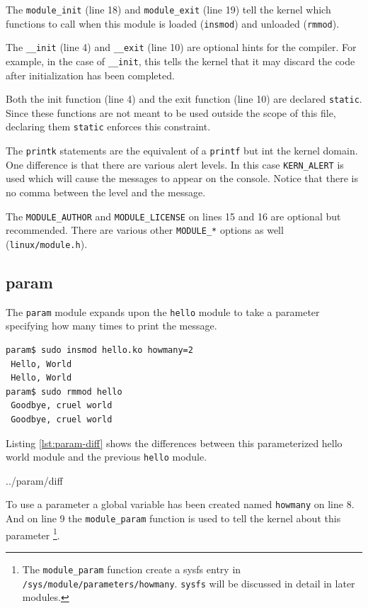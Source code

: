 \documentclass{article}
\begin{document}
The \verb+module_init+ (line 18) and \verb+module_exit+ (line 19) tell
the kernel which functions to call when this module is
loaded (\verb+insmod+) and unloaded (\verb+rmmod+).

The \verb+__init+ (line 4) and \verb+__exit+ (line 10)
are optional hints for the compiler.  For example, in the case of
\verb+__init+, this tells the kernel that it may discard the code
after initialization has been completed.

Both the init function (line 4) and the exit function (line 10)
are declared \verb+static+.
Since these functions are not meant to be used outside the scope
of this file, declaring them \verb+static+ enforces this
constraint\autocite[Pg. 52]{corbet2009linux}.

The \verb+printk+ statements are the equivalent of a \verb+printf+ but
int the kernel domain.
One difference is that there are various alert levels.
In this case \verb+KERN_ALERT+ is used which will cause the messages
to appear on the console.
Notice that there is no comma between the level and the message.

The \verb+MODULE_AUTHOR+ and \verb+MODULE_LICENSE+ on lines 15 and 16
are optional but recommended\autocite[Pg. 51]{corbet2009linux}.
There are various other \verb+MODULE_*+
options as well (\verb+linux/module.h+).

\subsection{param}

The \verb+param+ module expands upon the \verb+hello+ module to
take a parameter specifying how many times to print the message.

\begin{verbatim}
param$ sudo insmod hello.ko howmany=2
 Hello, World
 Hello, World
param$ sudo rmmod hello
 Goodbye, cruel world
 Goodbye, cruel world
\end{verbatim}

Listing \ref{lst:param-diff} shows the differences between this
parameterized hello world module and the previous \verb+hello+ module.


	{../param/diff}

To use a parameter a global variable has been created named \verb+howmany+
on line 8.
And on line 9 the \verb+module_param+ function is used to tell
the kernel about this parameter
\footnote{The \verb+module_param+ function create a sysfs entry
in \verb+/sys/module/parameters/howmany+.  \verb+sysfs+ will
be discussed in detail in later modules.}.
\end{document}
